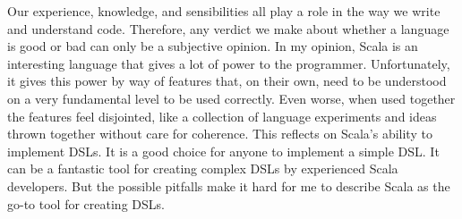 Our experience, knowledge, and sensibilities all play a role in the way we write and understand code.
Therefore, any verdict we make about whether a language is good or bad can only be a subjective opinion.
In my opinion, Scala is an interesting language that gives a lot of power to the programmer.
Unfortunately, it gives this power by way of features that, on their own, need to be understood on a very fundamental level to be used correctly.
Even worse, when used together the features feel disjointed, like a collection of language experiments and ideas thrown together without care for coherence.
This reflects on Scala's ability to implement DSLs.
It is a good choice for anyone to implement a simple DSL.
It can be a fantastic tool for creating complex DSLs by experienced Scala developers.
But the possible pitfalls make it hard for me to describe Scala as the go-to tool for creating DSLs.

